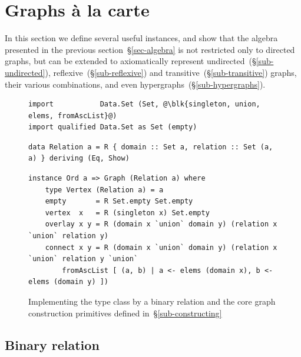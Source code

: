 \section{Graphs \`{a} la carte}\label{sec-a-la-carte}

In this section we define several useful  instances, and
show that the algebra presented in the previous section~\S\ref{sec-algebra} is
not restricted only
to directed graphs, but can be extended to axiomatically represent
undirected~(\S\ref{sub-undirected}), reflexive~(\S\ref{sub-reflexive})
and transitive~(\S\ref{sub-transitive}) graphs, their various combinations,
and even hypergraphs~(\S\ref{sub-hypergraphs}).

\begin{figure}[b]
\vspace{-3mm}
\begin{verbatim}
import           Data.Set (Set, @\blk{singleton, union, elems, fromAscList}@)
import qualified Data.Set as Set (empty)
\end{verbatim}
\vspace{1mm}
\begin{verbatim}
data Relation a = R { domain :: Set a, relation :: Set (a, a) } deriving (Eq, Show)
\end{verbatim}
\vspace{1mm}
\begin{verbatim}
instance Ord a => Graph (Relation a) where
    type Vertex (Relation a) = a
    empty       = R Set.empty Set.empty
    vertex  x   = R (singleton x) Set.empty
    overlay x y = R (domain x `union` domain y) (relation x `union` relation y)
    connect x y = R (domain x `union` domain y) (relation x `union` relation y `union`
        fromAscList [ (a, b) | a <- elems (domain x), b <- elems (domain y) ])
\end{verbatim}
\vspace{-3mm}
\caption{Implementing the  type class by a binary relation
and the core graph construction primitives
defined in~\S\ref{sub-constructing}\label{fig-relation}}
\vspace{-3mm}
\end{figure}

\subsection{Binary relation}\label{sub-relation}


